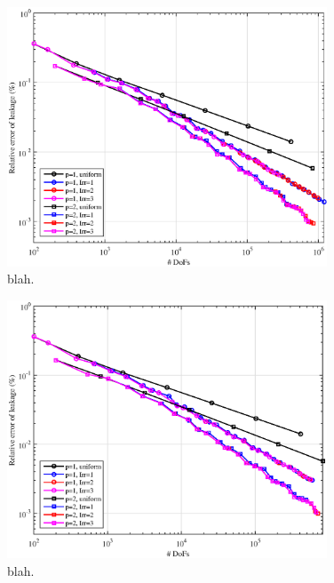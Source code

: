\begin{figure}
\centering
\includegraphics[width=0.85\textwidth]{figures/sec_BF/SL_PWL_Err.eps}
\caption{blah.}
\label{fig::BF_Results_SL_PWL_err}
\end{figure}

\begin{figure}
\centering
\includegraphics[width=0.85\textwidth]{figures/sec_BF/SL_MV_Err.eps}
\caption{blah.}
\label{fig::BF_Results_SL_MV_err}
\end{figure}

